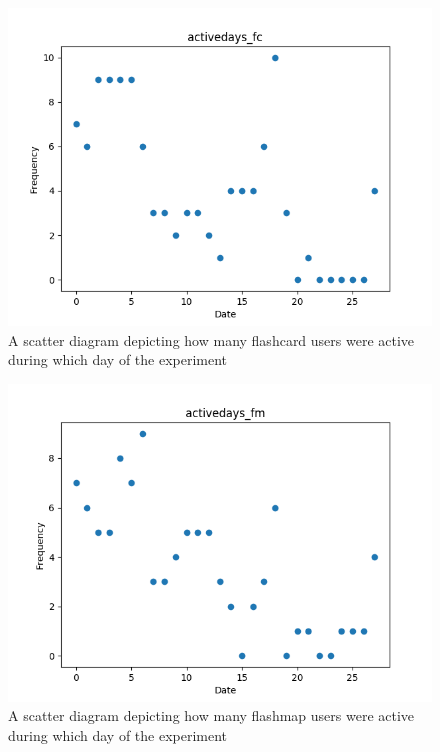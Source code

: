\begin{figure}
    \includegraphics{img/activedays_fc.png}
    \caption{A scatter diagram depicting how many flashcard users were active during which day of the experiment}
    \label{fig:activedays_fc}
\end{figure}
\begin{figure}
    \includegraphics{img/activedays_fm.png}
    \caption{A scatter diagram depicting how many flashmap users were active during which day of the experiment}
    \label{fig:activedays_fm}
\end{figure}
